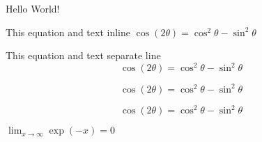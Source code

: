 \documentclass{article}
\begin{document}
Hello World!


This equation and text inline  \(\cos (2\theta) = \cos^2 \theta - \sin^2 \theta  \)

This equation and text separate line  \[\cos (2\theta) = \cos^2 \theta - \sin^2 \theta  \]

\begin{equation}
\cos (2\theta) = \cos^2 \theta - \sin^2 \theta 
\end{equation}

\begin{displaymath}
\cos (2\theta) = \cos^2 \theta - \sin^2 \theta 
\end{displaymath}

\displaystyle\(\lim_{x \to \infty} \exp(-x) = 0\)
\end{document}
